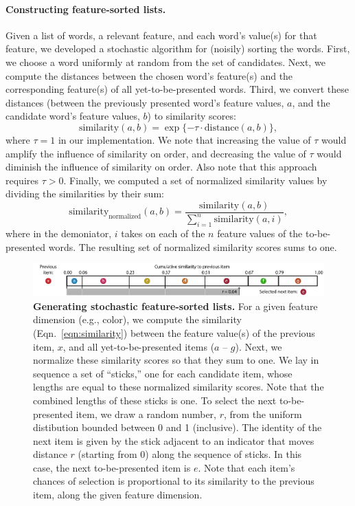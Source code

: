 \documentclass[11pt]{article}
\begin{document}
\paragraph{Constructing feature-sorted lists.} Given a list of words, a
relevant feature, and each word's value(s) for that feature, we developed a
stochastic algorithm for (noisily) sorting the words. First, we choose a word
uniformly at random from the set of candidates. Next, we compute the distances
between the chosen word's feature(s) and the corresponding feature(s) of all
yet-to-be-presented words. Third, we convert these distances (between the
previously presented word's feature values, $a$, and the candidate word's
feature values, $b$) to similarity scores: \begin{equation}
\mathrm{similarity}(a, b) = \exp\{-\tau \cdot \mathrm{distance}(a, b)\},
\label{eqn:similarity} \end{equation} where $\tau = 1$ in our implementation.
We note that increasing the value of $\tau$ would amplify the influence of
similarity on order, and decreasing the value of $\tau$ would diminish the
influence of similarity on order. Also note that this approach requires $\tau >
0$. Finally, we computed a set of normalized similarity values by dividing the
similarities by their sum: \begin{equation}
\mathrm{similarity}_{\mathrm{normalized}}(a, b) = \frac{\mathrm{similarity}(a,
b)}{\sum_{i=1}^n \mathrm{similarity}(a, i)}, \end{equation} where in the
demoniator, $i$ takes on each of the $n$ feature values of the to-be-presented
words. The resulting set of normalized similarity scores sums to one.

\begin{figure}[tp]
    \centering
        \includegraphics[width=\textwidth]{figures/stick}
        
\caption{\textbf{Generating stochastic feature-sorted lists.} For a given
feature dimension (e.g., color), we compute the similarity
(Eqn.~\ref{eqn:similarity}) between the feature value(s) of the previous item,
$x$, and all yet-to-be-presented items ($a$ -- $g$). Next, we normalize these
similarity scores so that they sum to one. We lay in sequence a set of
``sticks,'' one for each candidate item, whose lengths are equal to these
normalized similarity scores. Note that the combined lengths of these sticks is
one. To select the next to-be-presented item, we draw a random number, $r$,
from the uniform distibution bounded between 0 and 1 (inclusive). The identity
of the next item is given by the stick adjacent to an indicator that moves
distance $r$ (starting from 0) along the sequence of sticks. In this case, the
next to-be-presented item is $e$. Note that each item's chances of selection is
proportional to its similarity to the previous item, along the given feature
dimension.} \label{fig:stick} 

\end{figure}
\end{document}
